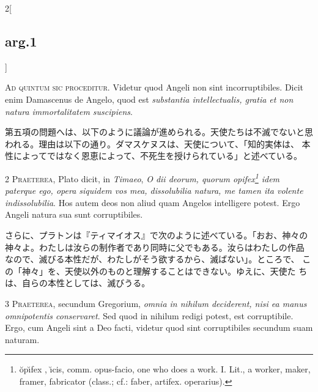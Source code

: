 \documentclass[paper=a4paper,fontsize=10pt,jafontsize=9pt,titlepage]{jlreq}
\begin{document}
\begin{paracol}{2}[\subsection{arg.1}]

{\huge A}{\scshape d quintum sic proceditur}. Videtur quod
Angeli non sint incorruptibiles. Dicit enim Damascenus de Angelo, quod
est {\itshape substantia intellectualis, gratia et non natura immortalitatem
suscipiens}.

\switchcolumn

第五項の問題へは、以下のように議論が進められる。天使たちは不滅でないと思
 われる。理由は以下の通り。ダマスケヌスは、天使について、「知的実体は、
 本性によってではなく恩恵によって、不死生を授けられている」と述べている。


{\scshape 2 Praeterea}, Plato dicit, in {\itshape Timaeo}, {\itshape O
dii deorum, quorum opifex\footnote{ \u{o}p\u{\i}fex , \u{\i}cis,
comm. opus-facio, one who does a work.  I. Lit., a worker, maker,
framer, fabricator (class.; cf.: faber, artifex. operarius).  } idem
paterque ego, opera siquidem vos mea, dissolubilia natura, me tamen ita
volente indissolubilia}. Hos autem deos non aliud quam Angelos
intelligere potest. Ergo Angeli natura sua sunt corruptibiles.

\switchcolumn

さらに、プラトンは『ティマイオス』で次のように述べている。「おお、神々の
 神々よ。わたしは汝らの制作者であり同時に父でもある。汝らはわたしの作品
 なので、滅びる本性だが、わたしがそう欲するから、滅ばない」。ところで、
 この「神々」を、天使以外のものと理解することはできない。ゆえに、天使た
 ちは、自らの本性としては、滅びうる。


{\scshape 3 Praeterea}, secundum Gregorium, {\itshape omnia in
nihilum deciderent, nisi ea manus omnipotentis conservaret}. Sed quod in
nihilum redigi potest, est corruptibile. Ergo, cum Angeli sint a Deo
facti, videtur quod sint corruptibiles secundum suam naturam.

\switchcolumn


\end{paracol}
\end{document}
